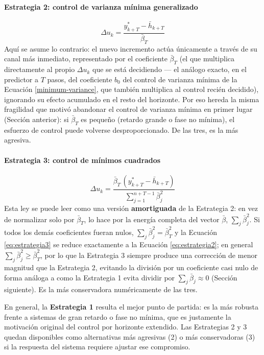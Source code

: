 \paragraph{Estrategia 2: control de varianza mínima generalizado}
\begin{equation}
  \Delta u_k = \frac{y^*_{k+T} - \bar h_{k+T}}{\bar\beta_T}
  \label{eq:estrategia2}
\end{equation}
Aquí se asume lo contrario: el nuevo incremento actúa únicamente a través de su canal más inmediato, representado por el coeficiente $\bar\beta_T$ (el que multiplica directamente al propio $\Delta u_k$ que se está decidiendo — el análogo exacto, en el predictor a $T$ pasos, del coeficiente $b_0$ del control de varianza mínima de la Ecuación \ref{minimum-variance}, que también multiplica al control recién decidido), ignorando su efecto acumulado en el resto del horizonte. Por eso hereda la misma fragilidad que motivó abandonar el control de varianza mínima en primer lugar (Sección anterior): si $\bar\beta_T$ es pequeño (retardo grande o fase no mínima), el esfuerzo de control puede volverse desproporcionado. De las tres, es la más agresiva.

\paragraph{Estrategia 3: control de mínimos cuadrados}
\begin{equation}
  \Delta u_k = \frac{\bar\beta_T\,(y^*_{k+T} - \bar h_{k+T})}{\displaystyle\sum_{j=1}^{n+T-1} \bar\beta_j^2}
  \label{eq:estrategia3}
\end{equation}
Esta ley se puede leer como una versión \textbf{amortiguada} de la Estrategia 2: en vez de normalizar solo por $\bar\beta_T$, lo hace por la energía completa del vector $\bar\beta$, $\sum_j \bar\beta_j^2$. Si todos los demás coeficientes fueran nulos, $\sum_j\bar\beta_j^2 = \bar\beta_T^2$ y la Ecuación \ref{eq:estrategia3} se reduce exactamente a la Ecuación \ref{eq:estrategia2}; en general $\sum_j\bar\beta_j^2 \geq \bar\beta_T^2$, por lo que la Estrategia 3 siempre produce una corrección de menor magnitud que la Estrategia 2, evitando la división por un coeficiente casi nulo de forma análoga a como la Estrategia 1 evita dividir por $\sum_j\bar\beta_j \approx 0$ (Sección siguiente). Es la más conservadora numéricamente de las tres.

En general, la \textbf{Estrategia 1} resulta el mejor punto de partida: es la más robusta frente a sistemas de gran retardo o fase no mínima, que es justamente la motivación original del control por horizonte extendido. Las Estrategias 2 y 3 quedan disponibles como alternativas más agresivas (2) o más conservadoras (3) si la respuesta del sistema requiere ajustar ese compromiso.

